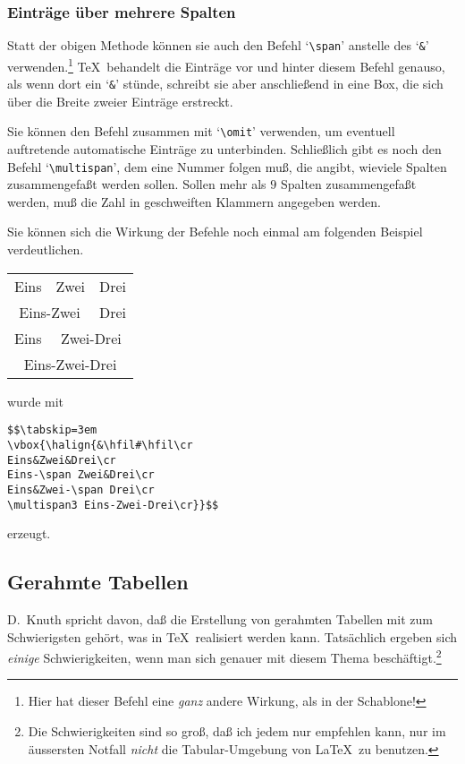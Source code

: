 \subsubsection{Eintr\"age \"uber mehrere Spalten}
Statt der obigen Methode k\"onnen sie auch den Befehl
`\verb|\span|' anstelle des `\verb|&|' verwenden.\footnote{Hier hat
dieser Befehl eine {\em ganz} andere Wirkung, als in der
Schablone!}
\TeX\ behandelt die Eintr\"age vor und hinter diesem Befehl genauso, als
wenn dort ein `\verb|&|' st\"unde, schreibt sie aber anschlie\ss{}end in
eine Box, die sich \"uber die Breite zweier Eintr\"age erstreckt.

Sie k\"onnen den Befehl zusammen mit 
`\verb|\omit|' verwenden, um
eventuell auftretende automatische Eintr\"age zu unterbinden.
Schlie\ss{}lich gibt es noch den Befehl
`\verb|\multispan|', dem eine
Nummer folgen mu\ss{}, die angibt, wieviele 
Spalten zusammengefa\ss{}t werden
sollen. Sollen mehr als $9$ Spalten zusammengefa\ss{}t werden, mu\ss{} die
Zahl in geschweiften Klammern angegeben werden.

Sie k\"onnen sich die Wirkung der Befehle noch einmal am folgenden
Beispiel verdeutlichen.

\medskip\begin{tabular}{ccc}
Eins & Zwei & Drei \\
\multicolumn{2}{c}{Eins-Zwei} & Drei\\
Eins &\multicolumn{2}{c}{Zwei-Drei}\\
\multicolumn{3}{c}{Eins-Zwei-Drei}
\end{tabular}\medskip

wurde mit
\begin{verbatim}
$$\tabskip=3em
\vbox{\halign{&\hfil#\hfil\cr
Eins&Zwei&Drei\cr
Eins-\span Zwei&Drei\cr
Eins&Zwei-\span Drei\cr
\multispan3 Eins-Zwei-Drei\cr}}$$
\end{verbatim}
erzeugt.
\subsection{Gerahmte Tabellen}
D.~Knuth spricht davon, da\ss{} die Erstellung von gerahmten Tabellen mit
zum Schwierigsten geh\"ort, was in \TeX\ realisiert werden kann.
Tats\"achlich ergeben sich {\em einige} Schwierigkeiten, wenn man sich
genauer mit diesem Thema besch\"aftigt.\footnote{Die Schwierigkeiten
sind so gro\ss{}, da\ss{} ich jedem nur empfehlen kann, nur im \"aussersten
Notfall {\em nicht} die Tabular-Umgebung von \LaTeX\ zu benutzen.}

